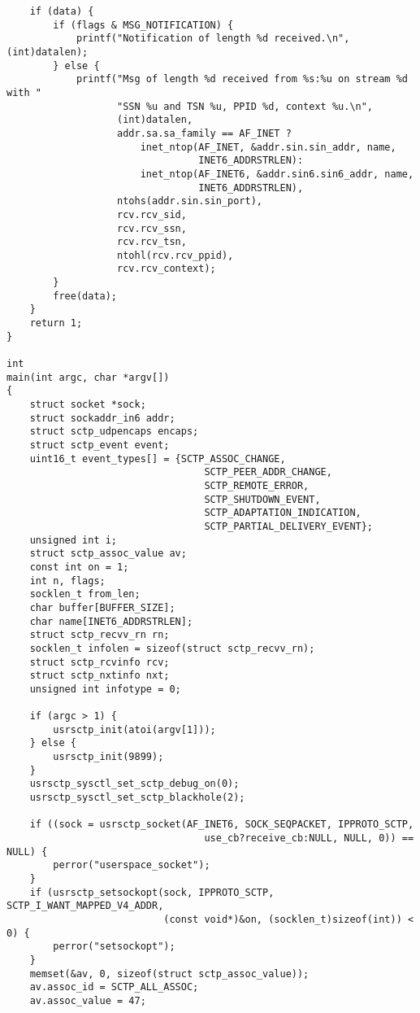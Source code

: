 \documentclass[a4paper]{article}
\begin{document}
\begin{verbatim}
    if (data) {
        if (flags & MSG_NOTIFICATION) {
            printf("Notification of length %d received.\n", (int)datalen);
        } else {
            printf("Msg of length %d received from %s:%u on stream %d with "
                   "SSN %u and TSN %u, PPID %d, context %u.\n",
                   (int)datalen,
                   addr.sa.sa_family == AF_INET ?
                       inet_ntop(AF_INET, &addr.sin.sin_addr, name, 
                                 INET6_ADDRSTRLEN):
                       inet_ntop(AF_INET6, &addr.sin6.sin6_addr, name, 
                                 INET6_ADDRSTRLEN),
                   ntohs(addr.sin.sin_port),
                   rcv.rcv_sid,
                   rcv.rcv_ssn,
                   rcv.rcv_tsn,
                   ntohl(rcv.rcv_ppid),
                   rcv.rcv_context);
        }
        free(data);
    }
    return 1;
}

int
main(int argc, char *argv[])
{
    struct socket *sock;
    struct sockaddr_in6 addr;
    struct sctp_udpencaps encaps;
    struct sctp_event event;
    uint16_t event_types[] = {SCTP_ASSOC_CHANGE,
	                              SCTP_PEER_ADDR_CHANGE,
	                              SCTP_REMOTE_ERROR,
	                              SCTP_SHUTDOWN_EVENT,
	                              SCTP_ADAPTATION_INDICATION,
	                              SCTP_PARTIAL_DELIVERY_EVENT};
    unsigned int i;
    struct sctp_assoc_value av;
    const int on = 1;
    int n, flags;
    socklen_t from_len;
    char buffer[BUFFER_SIZE];
    char name[INET6_ADDRSTRLEN];
    struct sctp_recvv_rn rn;
    socklen_t infolen = sizeof(struct sctp_recvv_rn);
    struct sctp_rcvinfo rcv;
    struct sctp_nxtinfo nxt;
    unsigned int infotype = 0;

    if (argc > 1) {
        usrsctp_init(atoi(argv[1]));
    } else {
        usrsctp_init(9899);
    }
    usrsctp_sysctl_set_sctp_debug_on(0);
    usrsctp_sysctl_set_sctp_blackhole(2);

    if ((sock = usrsctp_socket(AF_INET6, SOCK_SEQPACKET, IPPROTO_SCTP, 
    	                          use_cb?receive_cb:NULL, NULL, 0)) == NULL) {
        perror("userspace_socket");
    }
    if (usrsctp_setsockopt(sock, IPPROTO_SCTP, SCTP_I_WANT_MAPPED_V4_ADDR, 
                           (const void*)&on, (socklen_t)sizeof(int)) < 0) {
        perror("setsockopt");
    }
    memset(&av, 0, sizeof(struct sctp_assoc_value));
    av.assoc_id = SCTP_ALL_ASSOC;
    av.assoc_value = 47;


\end{verbatim}
\end{document}

